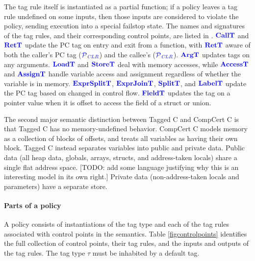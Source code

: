 \documentclass{llncs}
\begin{document}
The tag rule itself is instantiated as a partial function; if a policy leaves a tag rule
undefined on some inputs, then those inputs are considered to violate the policy, sending
execution into a special failstop state. The names and signatures of the tag rules,
and their corresponding control points, are listed in .
\(\calltname\) and \(\rettname\) update the PC tag on entry and exit from a function,
with \(\rettname\) aware of both the caller's PC tag (\(\PCT[_{\color{blue} CLR}]\))
and the callee's (\(\PCT[_{\color{blue} CLR}]\)). \(\argtname\) updates tags on any arguments.
\(\loadtname\) and \(\storetname\) deal with memory accesses, while \(\accesstname\) and
\(\assigntname\) handle variable access and assignment regardless of whether the variable
is in memory. \(\exprsplittname\), \(\exprjointname\), \(\splittname\), and \(\labeltname\)
update the PC tag based on changed in control flow. \(\fieldtname\) updates the tag
on a pointer value when it is offset to access the field of a struct or union.

The second major semantic distinction between Tagged C and CompCert C is that Tagged C has no
memory-undefined behavior. CompCert C models memory as a collection of blocks of offsets,
and treats all variables as having their own block. Tagged C instead separates variables
into public and private data. Public data (all heap data, globals, arrays, structs, and
address-taken locals) share a single flat address
space. [TODO: add some language justifying why this is an interesting model in its own right.]
Private data (non-address-taken locals and parameters) have a separate store.


\paragraph*{Parts of a policy}

A policy consists of instantiations of the tag type
and each of the tag rules associated with control points in the semantics. Table \cref{figcontrolpoints}
identifies the full collection of control points, their tag rules, and the inputs and outputs of the tag rules.
The tag type \(\tau\) must be inhabited by a default tag.
\end{document}

